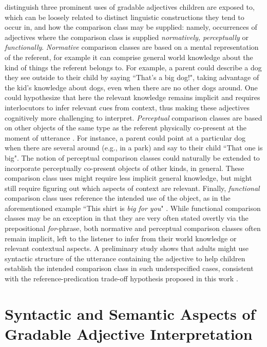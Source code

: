 \textcite{ebeling1994children} distinguish three prominent uses of gradable adjectives children are exposed to, which can be loosely related to distinct linguistic constructions they tend to occur in, and how the comparison class may be supplied: namely, occurrences of adjectives where the comparison class is supplied \textit{normatively, perceptually} or \textit{functionally}. 
\emph{Normative} comparison classes are based on a mental representation of the referent, for example it can comprise general world knowledge about the kind of things the referent belongs to. For example, a parent could describe a dog they see outside to their child by saying ``That's a big dog!", taking advantage of the kid's knowledge about dogs, even when there are no other dogs around. One could hypothesize that here the relevant knowledge remains implicit and requires interlocutors to infer relevant cues from context, thus making these adjectives cognitively more challenging to interpret. 
\emph{Perceptual} comparison classes are based on other objects of the same type as the referent physically co-present at the moment of utterance \parencite{ebeling1994children}. For instance, a parent could point at a particular dog when there are several around (e.g., in a park) and say to their child ``That one is big". The notion of perceptual comparison classes could naturally be extended to incorporate perceptually co-present objects of other kinds, in general. These comparison class uses might require less implicit general knowledge, but might still require figuring out which aspects of context are relevant. 
Finally, \emph{functional} comparison class uses reference the intended use of the object, as in the aforementioned example ``This shirt is \emph{big for you}" \parencite{ebeling1994children, sera1987}. 
While functional comparison classes may be an exception in that they are very often stated overtly via the prepositional \textit{for}-phrase, both normative and perceptual comparison classes often remain implicit, left to the listener to infer from their world knowledge or relevant contextual aspects. A preliminary study shows that adults might use syntactic structure of the utterance containing the adjective to help children establish the intended comparison class in such underspecified cases, consistent with the reference-predication trade-off hypothesis proposed in this work \parencite[discussed in greater detail in Chapter \ref{chapter06}]{sinelnikova2020}. 

\section{Syntactic and Semantic Aspects of Gradable Adjective Interpretation}
\label{2.3.}

